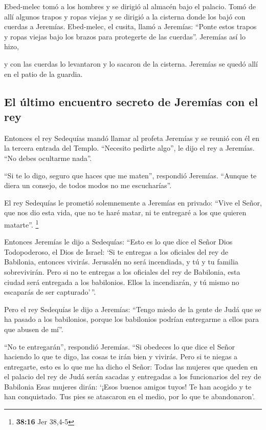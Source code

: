 Ebed-melec tomó a los hombres y se dirigió al almacén
bajo el palacio. Tomó de allí algunos trapos y ropas viejas y se dirigió
a la cisterna donde los bajó con cuerdas a Jeremías. 
Ebed-melec, el cusita, llamó a Jeremías: ``Ponte estos trapos y ropas
viejas bajo los brazos para protegerte de las cuerdas''. Jeremías así lo
hizo,

 y con las cuerdas lo levantaron y lo sacaron de la
cisterna. Jeremías se quedó allí en el patio de la guardia.

\hypertarget{el-uxfaltimo-encuentro-secreto-de-jeremuxedas-con-el-rey}{%
\subsection{El último encuentro secreto de Jeremías con el
rey}\label{el-uxfaltimo-encuentro-secreto-de-jeremuxedas-con-el-rey}}

 Entonces el rey Sedequías mandó llamar al profeta
Jeremías y se reunió con él en la tercera entrada del Templo. ``Necesito
pedirte algo'', le dijo el rey a Jeremías. ``No debes ocultarme nada''.

 ``Si te lo digo, seguro que haces que me maten'',
respondió Jeremías. ``Aunque te diera un consejo, de todos modos no me
escucharías''.

 El rey Sedequías le prometió solemnemente a Jeremías en
privado: ``Vive el Señor, que nos dio esta vida, que no te haré matar,
ni te entregaré a los que quieren matarte''. \footnote{\textbf{38:16}
  Jer 38,4-5}

 Entonces Jeremías le dijo a Sedequías: ``Esto es lo que
dice el Señor Dios Todopoderoso, el Dios de Israel: `Si te entregas a
los oficiales del rey de Babilonia, entonces vivirás. Jerusalén no será
incendiada, y tú y tu familia sobrevivirán.  Pero si no
te entregas a los oficiales del rey de Babilonia, esta ciudad será
entregada a los babilonios. Ellos la incendiarán, y tú mismo no
escaparás de ser capturado'\,''.

 Pero el rey Sedequías le dijo a Jeremías: ``Tengo miedo
de la gente de Judá que se ha pasado a los babilonios, porque los
babilonios podrían entregarme a ellos para que abusen de mí''.

 ``No te entregarán'', respondió Jeremías. ``Si obedeces
lo que dice el Señor haciendo lo que te digo, las cosas te irán bien y
vivirás.  Pero si te niegas a entregarte, esto es lo que
me ha dicho el Señor:  Todas las mujeres que queden en el
palacio del rey de Judá serán sacadas y entregadas a los funcionarios
del rey de Babilonia Esas mujeres dirán: `¡Esos buenos amigos tuyos! Te
han acogido y te han conquistado. Tus pies se atascaron en el medio, por
lo que te abandonaron'.

